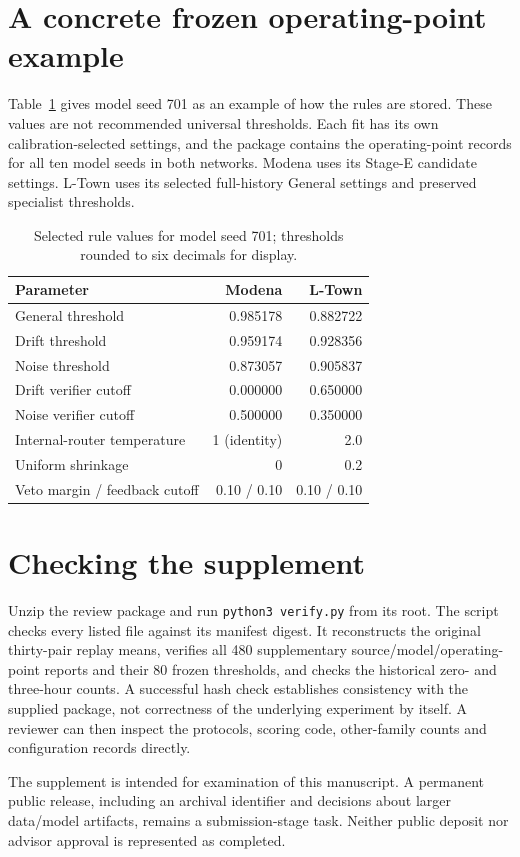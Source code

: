 \section{A concrete frozen operating-point example}
Table~\ref{tab:ruleexample} gives model seed 701 as an example of how the rules are stored. These values are not recommended universal thresholds. Each fit has its own calibration-selected settings, and the package contains the operating-point records for all ten model seeds in both networks. Modena uses its Stage-E candidate settings. L-Town uses its selected full-history General settings and preserved specialist thresholds.

\begin{table}[tbp]\centering\small
\caption[Example frozen operating points]{Selected rule values for model seed 701; thresholds rounded to six decimals for display.}\label{tab:ruleexample}
\begin{tabular}{@{}lrr@{}}\toprule Parameter & Modena & L-Town\\\midrule
General threshold & 0.985178 & 0.882722\\
Drift threshold & 0.959174 & 0.928356\\
Noise threshold & 0.873057 & 0.905837\\
Drift verifier cutoff & 0.000000 & 0.650000\\
Noise verifier cutoff & 0.500000 & 0.350000\\
Internal-router temperature & 1 (identity) & 2.0\\
Uniform shrinkage & 0 & 0.2\\
Veto margin / feedback cutoff & 0.10 / 0.10 & 0.10 / 0.10\\
\bottomrule\end{tabular}\end{table}

\section{Checking the supplement}
Unzip the review package and run \texttt{python3 verify.py} from its root. The script checks every listed file against its manifest digest. It reconstructs the original thirty-pair replay means, verifies all 480 supplementary source/model/operating-point reports and their 80 frozen thresholds, and checks the historical zero- and three-hour counts. A successful hash check establishes consistency with the supplied package, not correctness of the underlying experiment by itself. A reviewer can then inspect the protocols, scoring code, other-family counts and configuration records directly.

The supplement is intended for examination of this manuscript. A permanent public release, including an archival identifier and decisions about larger data/model artifacts, remains a submission-stage task. Neither public deposit nor advisor approval is represented as completed.


